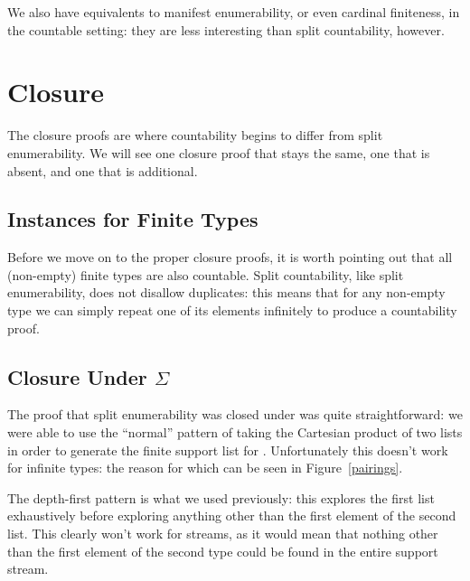 We also have equivalents to manifest enumerability, or even cardinal finiteness,
in the countable setting: they are less interesting than split countability,
however.
\section{Closure}
The closure proofs are where countability begins to differ from split
enumerability.
We will see one closure proof that stays the same, one that is absent, and one
that is additional.
\subsection{Instances for Finite Types}
Before we move on to the proper closure proofs, it is worth pointing out that
all (non-empty) finite types are also countable.
Split countability, like split enumerability, does not disallow duplicates: this
means that for any non-empty type we can simply repeat one of its elements
infinitely to produce a countability proof.
\subsection{Closure Under \(\Sigma\)}
The proof that split enumerability was closed under \AgdaDatatype{\(\Sigma\)}
was quite straightforward:
we were able to use the ``normal'' pattern of taking the Cartesian product of
two lists in order to generate the finite support list for
\AgdaDatatype{\(\Sigma\)}.
Unfortunately this doesn't work for infinite types: the reason for which can be
seen in Figure~\ref{pairings}.




The depth-first pattern is what we used previously: this explores the first list
exhaustively before exploring anything other than the first element of the
second list.
This clearly won't work for streams, as it would mean that nothing other than
the first element of the second type could be found in the entire support
stream.


